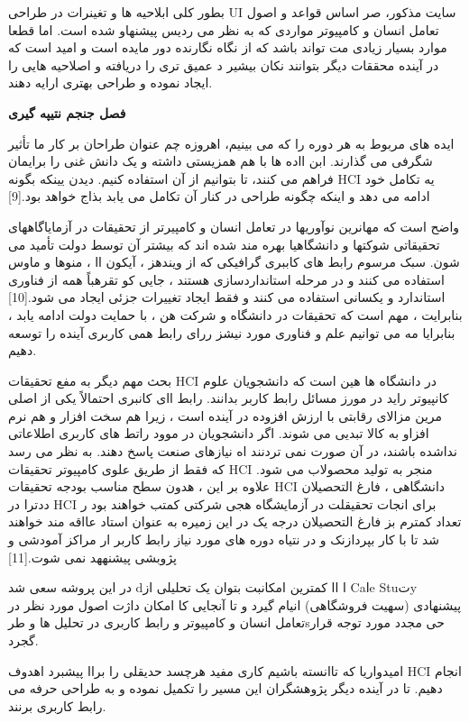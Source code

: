 \documentclass[13pt]{article}
\begin{document}
بطور کلی ابلاحیه ها و تغینرات در طراحی UI سایت مذکور، صر اساس قواعد و اصول تعامل
انسان و کامپیوتر مواردی که به نظر می ردیس پیشنهاو شده است. اما قطعا موارد بسیار
زیادی مت تواند باشد که از نگاه نگارنده دور مایده است و امید است که در آینده
محققات دیگر بتوانند نکان بیشیر د عمیق تری را دریافته و اصلاحیه هایی را ایجاد
نموده و طراحی بهتری ارایه دهند.

\textbf{{\LARGE فصل جنجم   نتیپه گیری}}

ایده های مربوط به هر دوره را که می بینیم، اهروزه چم عنوان طراحان بر کار ما تأثیر
شگرفی  می گذارند. ابن ااده ها با هم همزیستی داشته و یک دانش غنی را برایمان  فراهم
می کنند، تا بتوانیم از آن استفاده کنیم. دیدن یینکه بگونه HCI یه تکامل خود ادامه
می دهد و اینکه چگونه طراحی در کنار آن تکامل می یابد بذاج خواهد بود.[9]

واضح است که مهانرین نوآوریها در تعامل انسان و کامپیرتر از تحقیقات در
آزمایاگاههای تحقیقاتی شوکتها و دانشگاهیا بهره مند شده اند که بیشتر آن توسط دولت
تأمید می شون. سبک مرسوم رابط های کاببری گرافیکی که از ویندهز ، آیکون اا ، منوها و
ماوس استفاده می کنند و در مرحله استانداردسازی هستند ، جایی کو تقرهباً همه از
فناوری استاندارد و یکسانی استفاده می کنند و فقط ایجاد تغییرات جزئی ایجاد می
شود.[10] بنابرایت ، مهم است که تحقیقات در دانشگاه و شرکت هن ، با حمایت دولت ادامه
یابد ، بنابرایا مه می توانیم علم و فناوری مورد نیشز ررای رابط همی کاربری آینده را
توسعه دهیم.

بحث مهم دیگر به مفع تحقیقات HCI در دانشگاه ها هین است که دانشجویان علوم کانپیوتر
راید در مورز مسائل رابط کاربر بدانند. رابط اای کانبری احتمالاً یکی از اصلی مرین
مزالای رقابتی با ارزش افزوده در آینده است ، زیرا هم سخت افزار و هم نرم افزاو به
کالا تبدیی می شوند. اگر دانشجویان در موود راتط های کاربری اطلاعاتی نداشده باشند،
در آن صورت نمی تردنند اه نیازهای صنعت پاسخ دهند. به نظر می رسد که فقط از طریق
علوی کامپیوتر تحقیقات HCI منجر به تولید محصولاب می شود. علاوه بر این ، هدون سطح
مناسب بودجه تحقیقات HCI دانشگاهی ، فارغ التحصیلان ددترا در HCI برای انجات تحقیقلت
در آزمایشگاه هجی شرکتی کمتب خواهند بود ر تعداد کمترم بز فارغ التحصیلان درجه یک در
این زمیره به عنوان استاد عااقه مند خواهند شد تا با کار بپردازنک و در نتیاه  دوره
های مورد نیاز رابط کاربر ار مراکز آمودشی و پژوبشی  پیشنههد نمی شوت.[11]

در این پروشه سعی شد dا اا کمترین امکانبت بتوان یک تحلیلی از Caاe Stuتy پیشنهادی
(سهیت فروشگاهی) انیام گیرد و تا آنجایی کا امکان داژت اصول مورد نظر در تعامل انسان
و کامپیوتر و رابط کاربری در تحلیل ها و طرsحی مجدد مورد توجه قرار گجرد.

امیدواریا که تاانسته باشیم کاری مفید هرچسد حدیقلی را براا پیشبرد اهدوف HCI انجام
دهیم. تا در آینده دیگر پژوهشگران این مسیر را تکمیل نموده و به طراحی حرفه می رابط
کاربری برنند.
\end{document}
